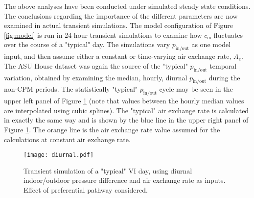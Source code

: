 \documentclass[preprint,12pt]{elsarticle}
\begin{document}
The above analyses have been conducted under simulated steady state conditions.
The conclusions regarding the importance of the different parameters are now examined in actual transient simulations.
The model configuration of Figure \ref{fig:model} is run in 24-hour transient simulations to examine how $c_\mathrm{in}$ fluctuates over the course  of a "typical" day.
The simulations vary $p_\mathrm{in/out}$ as one model input, and then assume either a constant or time-varying air exchange rate, $A_e$.
The ASU House dataset was again the source of the "typical" $p_\mathrm{in/out}$ temporal variation, obtained by examining the median, hourly, diurnal $p_\mathrm{in/out}$ during the non-CPM periods.
The statistically "typical" $p_\mathrm{in/out}$ cycle may be seen in the upper left panel of Figure \ref{fig:diurnal} (note that values between the hourly median values are interpolated using cubic splines).
The "typical" air exchange rate is calculated in exactly the same way and is shown by the blue line in the upper right panel of Figure \ref{fig:diurnal}.
The orange line is the air exchange rate value assumed for the calculations at constant air exchange rate.\par

\begin{figure}
  \centering
 \texttt{[image: diurnal.pdf]}
 \caption{Transient simulation of a "typical" VI day, using diurnal indoor/outdoor pressure difference and air exchange rate as inputs. Effect of preferential pathway considered.}\label{fig:diurnal}
\end{figure}
\end{document}
